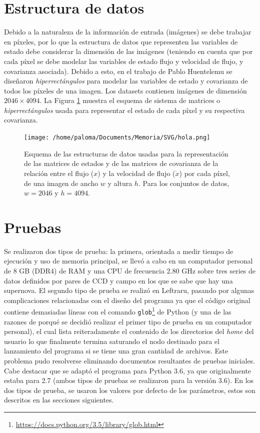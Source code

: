 \section{Estructura de datos}
\label{des:struct}
Debido a la naturaleza de la informaci\'on de entrada (im\'agenes) se debe trabajar en p\'ixeles, por lo que la estructura de datos que representen las variables de estado debe considerar la dimensi\'on de las im\'agenes (teniendo en cuenta que por cada p\'ixel se debe modelar las variables de estado flujo y velocidad de flujo, y covarianza asociada). Debido a esto, en el trabajo de Pablo Huentelemu \cite{huentelemu} se dise\~naron \textit{hiperrect\'angulos} para modelar las variables de estado y covarianza de todos los p\'ixeles de una imagen. Los datasets contienen im\'agenes de dimensi\'on  $2046 \times 4094$. La Figura \ref{fig:data_scheme} muestra el esquema de sistema de matrices o \textit{hiperrect\'angulos} usada para representar el estado de cada p\'ixel y su respectiva covarianza.
\bigskip  

\begin{figure}
\centering
\texttt{[image: /home/paloma/Documents/Memoria/SVG/hola.png]}
\caption{Esquema de las estructuras de datos usadas para la representaci\'on de las matrices de estados y de las matrices de covarianza de la relaci\'on entre el flujo ($x$) y la velocidad de flujo ($\dot{x}$) por cada p\'ixel, de una imagen de ancho $w$ y altura $h$. Para los conjuntos de datos, $w=2046$ y $h=4094$.}
\label{fig:data_scheme}
\end{figure}
\bigskip

\section{Pruebas}

Se realizaron dos tipos de prueba: la primera, orientada a medir tiempo de ejecuci\'on y uso de memoria principal, se llev\'o a cabo en un computador personal de 8 GB (DDR4) de RAM y una CPU de frecuencia 2.80 GHz sobre tres series de datos definidos por pares de CCD y campo en los que se sabe que hay una supernova. El segundo tipo de prueba se realiz\'o en Leftraru, pasando por algunas complicaciones relacionadas con el dise\~no del programa ya que el c\'odigo original contiene demasiadas l\'ineas con el comando \texttt{glob}\footnote{\url{https://docs.python.org/3.5/library/glob.html}} de Python (y una de las razones de porqu\'e se decidi\'o realizar el primer tipo de prueba en un computador personal), el cual lista reiteradamente el contenido de los directorios del \textit{home} del usuario lo que finalmente termina saturando el nodo destinado para el lanzamiento del programa si se tiene una gran cantidad de archivos. Este problema pudo resolverse eliminando documentos resultantes de pruebas iniciales. Cabe destacar que se adapt\'o el programa para Python 3.6, ya que originalmente estaba para 2.7 (ambos tipos de pruebas se realizaron para la versi\'on 3.6). En los dos tipos de prueba, se usaron los valores por defecto de los par\'ametros, estos son descritos en las secciones siguientes.
\bigskip


